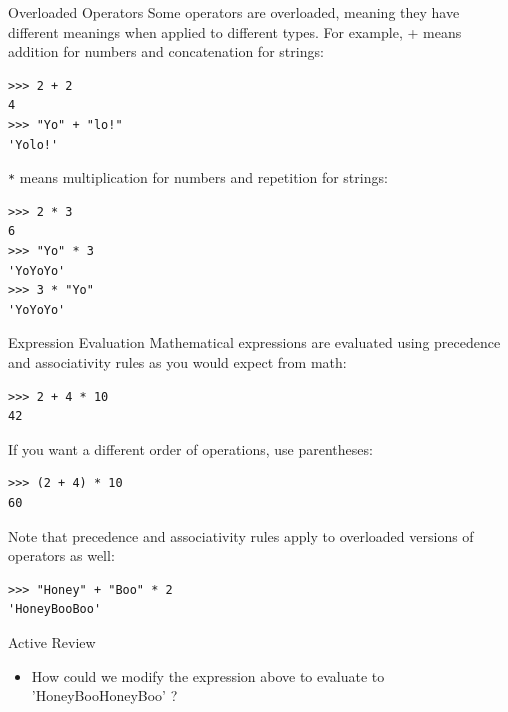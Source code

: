 \documentclass[smaller, aspectratio=1610]{beamer}
\begin{document}
\begin{frame}[label={sec:orga565fc5},fragile]{Overloaded Operators}
 Some operators are overloaded, meaning they have different meanings when applied to different types. For example, + means addition for numbers and concatenation for strings:

\lstset{language=Python,label= ,caption= ,captionpos=b,numbers=none}
\begin{lstlisting}
>>> 2 + 2
4
>>> "Yo" + "lo!"
'Yolo!'
\end{lstlisting}

\texttt{*} means multiplication for numbers and repetition for strings:

\lstset{language=Python,label= ,caption= ,captionpos=b,numbers=none}
\begin{lstlisting}
>>> 2 * 3
6
>>> "Yo" * 3
'YoYoYo'
>>> 3 * "Yo"
'YoYoYo'
\end{lstlisting}
\end{frame}

\begin{frame}[label={sec:org1ca505f},fragile]{Expression Evaluation}
 Mathematical expressions are evaluated using precedence and associativity rules as you would expect from math:

\lstset{language=Python,label= ,caption= ,captionpos=b,numbers=none}
\begin{lstlisting}
>>> 2 + 4 * 10
42
\end{lstlisting}

If you want a different order of operations, use parentheses:

\lstset{language=Python,label= ,caption= ,captionpos=b,numbers=none}
\begin{lstlisting}
>>> (2 + 4) * 10
60

\end{lstlisting}

Note that precedence and associativity rules apply to overloaded versions of operators as well:

\lstset{language=Python,label= ,caption= ,captionpos=b,numbers=none}
\begin{lstlisting}
>>> "Honey" + "Boo" * 2
'HoneyBooBoo'
\end{lstlisting}

\begin{block}{Active Review}
\begin{itemize}
\item How could we modify the expression above to evaluate to 'HoneyBooHoneyBoo' ?
\end{itemize}
\end{block}
\end{frame}
\end{document}
